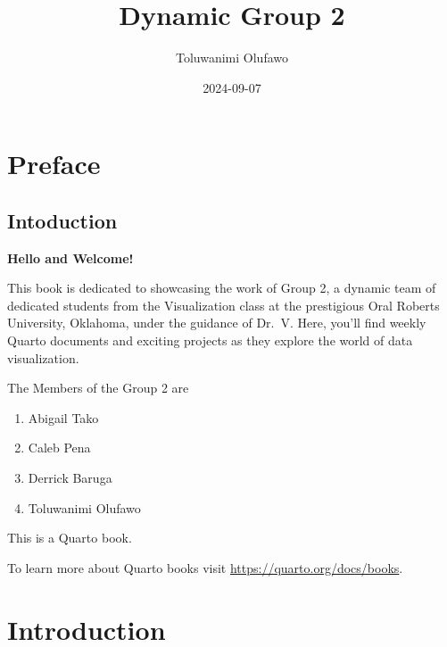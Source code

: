 \documentclass[
  letterpaper,
  DIV=11,
  numbers=noendperiod]{scrreprt}
\title{Dynamic Group 2}
\author{Toluwanimi Olufawo}
\date{2024-09-07}
\providecommand{\tightlist}{%
  \setlength{\itemsep}{0pt}\setlength{\parskip}{0pt}}\usepackage{longtable,booktabs,array}
\renewcommand*\contentsname{Table of contents}
\newcommand\contentsname{Table of contents}
\begin{document}
\maketitle

\renewcommand*\contentsname{Table of contents}
{
\hypersetup{linkcolor=}
\setcounter{tocdepth}{2}
\tableofcontents
}

\chapter*{Preface}\label{preface}


\section*{Intoduction}\label{intoduction}


\textbf{Hello and Welcome!}

This book is dedicated to showcasing the work of Group 2, a dynamic team
of dedicated students from the Visualization class at the prestigious
Oral Roberts University, Oklahoma, under the guidance of Dr.~V. Here,
you'll find weekly Quarto documents and exciting projects as they
explore the world of data visualization.

The Members of the Group 2 are

\begin{enumerate}
\def\labelenumi{\arabic{enumi}.}
\tightlist
\item
  Abigail Tako
\item
  Caleb Pena
\item
  Derrick Baruga
\item
  Toluwanimi Olufawo
\end{enumerate}

This is a Quarto book.

To learn more about Quarto books visit
\url{https://quarto.org/docs/books}.


\chapter{Introduction}\label{introduction}

\end{document}
